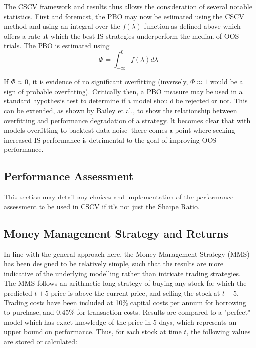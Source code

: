 \documentclass[a4paper,latin]{paper}
\begin{document}
The CSCV framework and results thus allows the consideration of several notable statistics. First and foremost, 
the PBO may now be estimated using the CSCV method and using an integral over the $f(\lambda)$ function 
as defined above which offers a rate at which the best IS strategies underperform the median of OOS trials. The PBO is estimated using
\begin{equation}
\Phi = \int_{-\infty}^{0} f (\lambda) d \lambda
\end{equation}


If $\Phi \approx 0$,
it is evidence of no significant overfitting (inversely, $\Phi \approx 1$ would be a sign of probable overfitting). Critically then, a PBO measure may be used in a standard hypothesis test to determine if a model should be rejected or not. This 
can be extended, as shown by Bailey et al., to show the relationship between overfitting and performance 
degradation of a strategy. It becomes clear that with models overfitting to backtest data noise, there comes a point 
where seeking increased IS performance is detrimental to the goal of improving OOS performance.  
\hfill \break 

\subsection{Performance Assessment}


This section may detail any choices and implementation of the performance assessment to be used in CSCV if it's not just the Sharpe Ratio. \todo{}

\subsection{Money Management Strategy and Returns}

In line with the general approach here, the Money Management Strategy (MMS) has been designed to be relatively simple, such that the results are more indicative of the underlying modelling rather than intricate trading strategies. The MMS follows an arithmetic long strategy of buying any stock for which the predicted ${t+5}$ price is above the current price, and selling the stock at ${t+5}$. Trading costs have been included at 10\% capital costs per annum for borrowing to purchase, and 0.45\% for transaction costs. Results are compared to a "perfect" model which has exact knowledge of the price in 5 days, which represents an upper bound on performance.
\hfill\break
Thus, for each stock at time $t$, the following values are stored or calculated:
\end{document}
